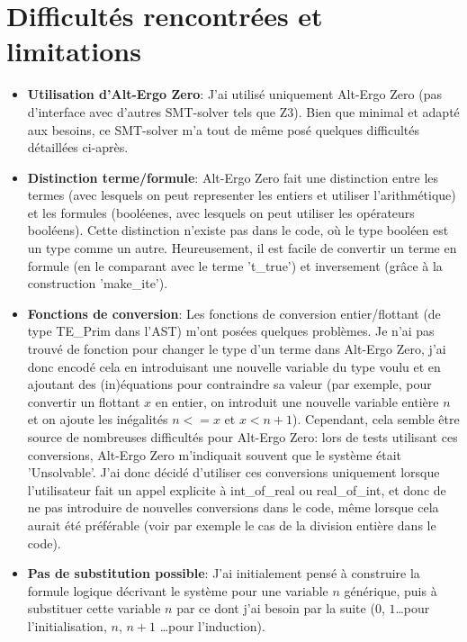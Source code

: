 \documentclass[a4paper]{article}%
\begin{document}
	\section{Difficultés rencontrées et limitations}

	\begin{itemize}
		\item \textbf{Utilisation d'Alt-Ergo Zero}: J'ai utilisé uniquement Alt-Ergo Zero (pas d'interface avec d'autres SMT-solver tels que Z3).
		Bien que minimal et adapté aux besoins, ce SMT-solver m'a tout de même posé quelques difficultés détaillées ci-après.\\
		\item \textbf{Distinction terme/formule}: Alt-Ergo Zero fait une distinction entre les termes (avec lesquels on peut representer les entiers
		et utiliser l'arithmétique) et les formules (booléenes, avec lesquels on peut utiliser les opérateurs booléens).
		Cette distinction n'existe pas dans le code, où le type booléen est un type comme un autre.
		Heureusement, il est facile de convertir un terme en formule (en le comparant avec le terme 't\_true') et inversement (grâce à la construction 'make\_ite').\\
		\item \textbf{Fonctions de conversion}: Les fonctions de conversion entier/flottant (de type TE\_Prim dans l'AST) m'ont posées quelques problèmes.
		Je n'ai pas trouvé de fonction pour changer le type d'un terme dans Alt-Ergo Zero, j'ai donc encodé cela en introduisant une nouvelle variable du type voulu
		et en ajoutant des (in)équations pour contraindre sa valeur (par exemple, pour convertir un flottant $x$ en entier, on introduit une nouvelle
		variable entière $n$ et on ajoute les inégalités $n <= x$ et $x < n+1$). Cependant, cela semble être source de nombreuses difficultés pour Alt-Ergo Zero:
		lors de tests utilisant ces conversions, Alt-Ergo Zero m'indiquait souvent que le système était 'Unsolvable'.
		J'ai donc décidé d'utiliser ces conversions uniquement lorsque l'utilisateur fait un appel explicite à int\_of\_real ou real\_of\_int, et donc de ne pas introduire
		de nouvelles conversions dans le code, même lorsque cela aurait été préférable (voir par exemple le cas de la division entière dans le code).\\
		\item \textbf{Pas de substitution possible}: J'ai initialement pensé à construire la formule logique décrivant le système pour une variable $n$ générique,
		puis à substituer cette variable $n$ par ce dont j'ai besoin par la suite ($0$, $1$\dots pour l'initialisation, $n$, $n+1$ \ldots pour l'induction).

\end{itemize}
\end{document}
